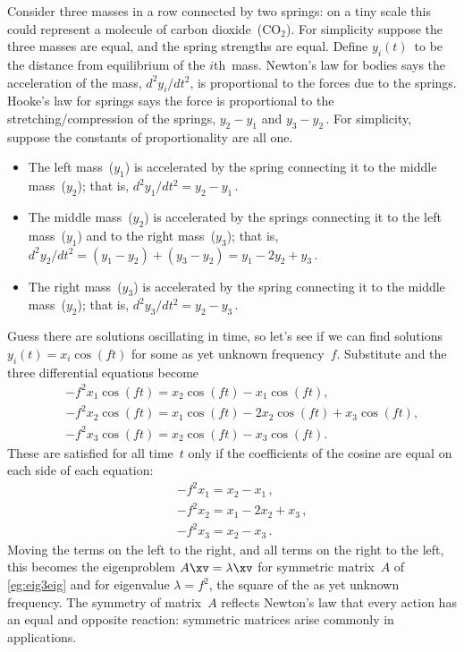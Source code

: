 \begin{example} \label{eg:eig3vib}
Consider three masses in a row connected by two springs: on a tiny scale this could represent a molecule of carbon dioxide~(\(\text{CO}_2\)).
For simplicity suppose the three masses are equal, and the spring strengths are equal.
Define \(y_i(t)\)~to be the distance from equilibrium of the \(i\)th~mass.
Newton's law for bodies says the acceleration of the mass, \(d^2y_i/dt^2\), is proportional to the forces due to the springs.
Hooke's law for springs says the force is proportional to the stretching\slash compression of the springs, \(y_2-y_1\) and \(y_3-y_2\)\,.
For simplicity, suppose the constants of proportionality are all one.
\begin{itemize}
\item The left mass~(\(y_1\)) is accelerated by the spring connecting it to the middle mass~(\(y_2\)); that is, \(d^2y_1/dt^2=y_2-y_1\)\,.
\item The middle mass~(\(y_2\)) is accelerated by the springs connecting it to the left mass~(\(y_1\)) and to the right mass~(\(y_3\)); that is, \(d^2y_2/dt^2=(y_1-y_2)+(y_3-y_2)=y_1-2y_2+y_3\)\,.
\item The right mass~(\(y_3\)) is accelerated by the spring connecting it to the middle mass~(\(y_2\)); that is, \(d^2y_3/dt^2=y_2-y_3\)\,.
\end{itemize}
Guess there are solutions oscillating in time, so let's see if we can find solutions \(y_i(t)=x_i\cos(ft)\) for some as yet unknown frequency~\(f\).
Substitute and the three differential equations become
\begin{eqnarray*}
&&-f^2x_1\cos(ft)=x_2\cos(ft)-x_1\cos(ft),
\\&&-f^2x_2\cos(ft)=x_1\cos(ft)-2x_2\cos(ft)+x_3\cos(ft),
\\&&-f^2x_3\cos(ft)=x_2\cos(ft)-x_3\cos(ft).
\end{eqnarray*}
These are satisfied for all time~\(t\) only if the coefficients of the cosine are equal on each side of each equation:
\begin{eqnarray*}
&&-f^2x_1=x_2-x_1\,,
\\&&-f^2x_2=x_1-2x_2+x_3\,,
\\&&-f^2x_3=x_2-x_3\,.
\end{eqnarray*}
Moving the terms on the left to the right, and all terms on the right to the left, this becomes the eigenproblem \(A\xv=\lambda\xv\) for symmetric matrix~\(A\) of \autoref{eg:eig3eig} and for eigenvalue \(\lambda=f^2\), the square of the as yet unknown frequency.
The symmetry of matrix~\(A\) reflects Newton's law that every action has an equal and opposite reaction: symmetric matrices arise commonly in applications.


\end{example}
